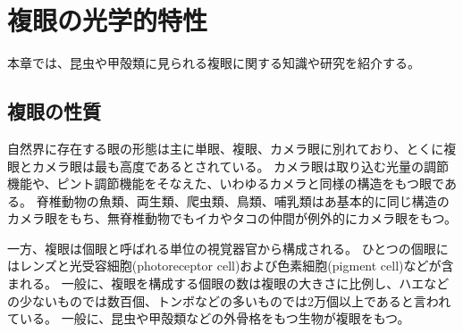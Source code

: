 \chapter{複眼の光学的特性}
\label{CKnowledge}

本章では、昆虫や甲殻類に見られる複眼に関する知識や研究を紹介する。





\section{複眼の性質}

自然界に存在する眼の形態は主に単眼、複眼、カメラ眼に別れており、とくに複眼とカメラ眼は最も高度であるとされている\cite{newton-2012-6}。
カメラ眼は取り込む光量の調節機能や、ピント調節機能をそなえた、いわゆるカメラと同様の構造をもつ眼である\cite{newton-2012-6}。
脊椎動物の魚類、両生類、爬虫類、鳥類、哺乳類はあ基本的に同じ構造のカメラ眼をもち、無脊椎動物でもイカやタコの仲間が例外的にカメラ眼をもつ\cite{newton-2012-6}。

一方、複眼は個眼と呼ばれる単位の視覚器官から構成される。
ひとつの個眼にはレンズと光受容細胞(photoreceptor cell)および色素細胞(pigment cell)などが含まれる。
一般に、複眼を構成する個眼の数は複眼の大きさに比例し、ハエなどの少ないものでは数百個、トンボなどの多いものでは2万個以上であると言われている\cite{arikawa-zougan}。
一般に、昆虫や甲殻類などの外骨格をもつ生物が複眼をもつ。

